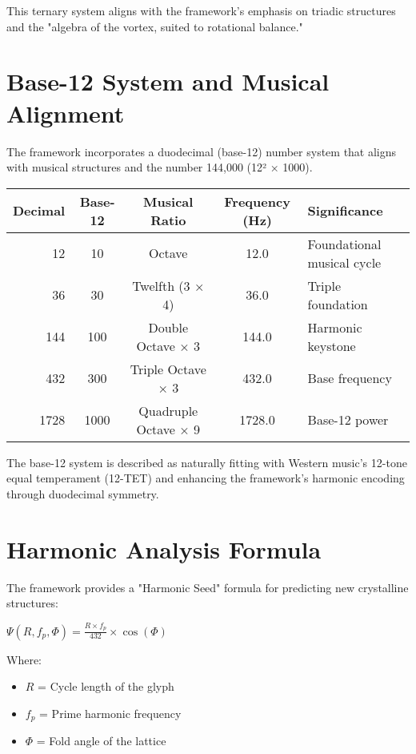 This ternary system aligns with the framework's emphasis on triadic structures and the "algebra of the vortex, suited to rotational balance."

\section{Base-12 System and Musical Alignment}

The framework incorporates a duodecimal (base-12) number system that aligns with musical structures and the number 144,000 (12² × 1000).

\begin{longtable}{|r|c|c|c|l|}
\hline
\textbf{Decimal} & \textbf{Base-12} & \textbf{Musical Ratio} & \textbf{Frequency (Hz)} & \textbf{Significance} \\
\hline
12 & 10 & Octave & 12.0 & Foundational musical cycle \\
\hline
36 & 30 & Twelfth (3 × 4) & 36.0 & Triple foundation \\
\hline
144 & 100 & Double Octave × 3 & 144.0 & Harmonic keystone \\
\hline
432 & 300 & Triple Octave × 3 & 432.0 & Base frequency \\
\hline
1728 & 1000 & Quadruple Octave × 9 & 1728.0 & Base-12 power \\
\hline
\end{longtable}

The base-12 system is described as naturally fitting with Western music's 12-tone equal temperament (12-TET) and enhancing the framework's harmonic encoding through duodecimal symmetry.

\section{Harmonic Analysis Formula}

The framework provides a "Harmonic Seed" formula for predicting new crystalline structures:

\begin{center}
$\Psi(R, f_p, \Phi) = \frac{R \times f_p}{432} \times \cos(\Phi)$
\end{center}

Where:
\begin{itemize}
    \item $R$ = Cycle length of the glyph
    \item $f_p$ = Prime harmonic frequency
    \item $\Phi$ = Fold angle of the lattice
\end{itemize}

